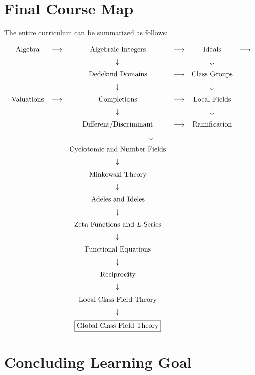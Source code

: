 \documentclass[11pt,a4paper]{article}
\begin{document}
\section{Final Course Map}

The entire curriculum can be summarized as follows:

\[
\begin{array}{cccccc}
\text{Algebra} &
\longrightarrow &
\text{Algebraic Integers} &
\longrightarrow &
\text{Ideals} &
\longrightarrow
\\[2mm]
&&
\downarrow &&
\downarrow
\\[2mm]
&&
\text{Dedekind Domains} &
\longrightarrow &
\text{Class Groups}
\\[2mm]
&&
\downarrow &&
\downarrow
\\[2mm]
\text{Valuations} &
\longrightarrow &
\text{Completions} &
\longrightarrow &
\text{Local Fields}
\\[2mm]
&&
\downarrow &&
\downarrow
\\[2mm]
&&
\text{Different/Discriminant} &
\longrightarrow &
\text{Ramification}
\\[2mm]
&&
\multicolumn{3}{c}{
\downarrow
}
\\[2mm]
&&
\text{Cyclotomic and Number Fields}
\\[2mm]
&&
\downarrow
\\[2mm]
&&
\text{Minkowski Theory}
\\[2mm]
&&
\downarrow
\\[2mm]
&&
\text{Adeles and Ideles}
\\[2mm]
&&
\downarrow
\\[2mm]
&&
\text{Zeta Functions and \(L\)-Series}
\\[2mm]
&&
\downarrow
\\[2mm]
&&
\text{Functional Equations}
\\[2mm]
&&
\downarrow
\\[2mm]
&&
\text{Reciprocity}
\\[2mm]
&&
\downarrow
\\[2mm]
&&
\text{Local Class Field Theory}
\\[2mm]
&&
\downarrow
\\[2mm]
&&
\boxed{\text{Global Class Field Theory}}
\end{array}
\]

\section{Concluding Learning Goal}
\end{document}
